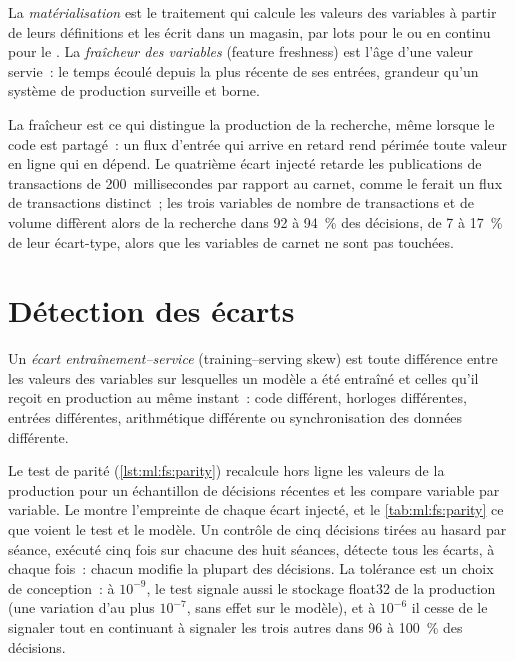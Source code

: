 \begin{definition}\label{def:ml:data-and-feature-stores:fresh}
La \emph{matérialisation} est le traitement qui calcule les valeurs des variables à partir de leurs définitions et les écrit
dans un magasin, par lots pour le  ou en continu pour le .
La \emph{fraîcheur des variables} (feature freshness) est l'âge d'une valeur servie~: le temps écoulé depuis la plus récente de ses entrées, grandeur qu'un système de production
surveille et borne.
\end{definition}

La fraîcheur est ce qui distingue la production de la recherche, même lorsque le code est partagé~: un flux d'entrée qui arrive en retard rend
périmée toute valeur en ligne qui en dépend. Le quatrième écart injecté retarde les publications de transactions de 200~millisecondes par rapport au
carnet, comme le ferait un flux de transactions distinct~; les trois variables de nombre de transactions et de volume diffèrent alors de la recherche dans 92 à 94~\% des
décisions, de 7 à 17~\% de leur écart-type, alors que les variables de carnet ne sont pas touchées.

\section{Détection des écarts}

\begin{definition}\label{def:ml:data-and-feature-stores:skew}
Un \emph{écart entraînement--service} (training--serving skew) est toute différence entre les valeurs des variables sur lesquelles un modèle a été entraîné
et celles qu'il reçoit en production au même instant~: code différent, horloges différentes, entrées différentes,
arithmétique différente ou synchronisation des données différente.
\end{definition}

Le test de parité (\cref{lst:ml:fs:parity}) recalcule hors ligne les valeurs de la production pour un échantillon de décisions récentes et les compare
variable par variable. Le  montre l'empreinte de chaque écart injecté, et le \cref{tab:ml:fs:parity} ce que voient le test
et le modèle. Un contrôle de cinq décisions tirées au hasard par séance, exécuté cinq fois sur chacune des huit séances, détecte
tous les écarts, à chaque fois~: chacun modifie la plupart des décisions. La tolérance est un choix de conception~: à $10^{-9}$, le test signale aussi
le stockage float32 de la production (une variation d'au plus $10^{-7}$, sans effet sur le modèle), et à $10^{-6}$ il cesse de le signaler tout en
continuant à signaler les trois autres dans 96 à 100~\% des décisions.

